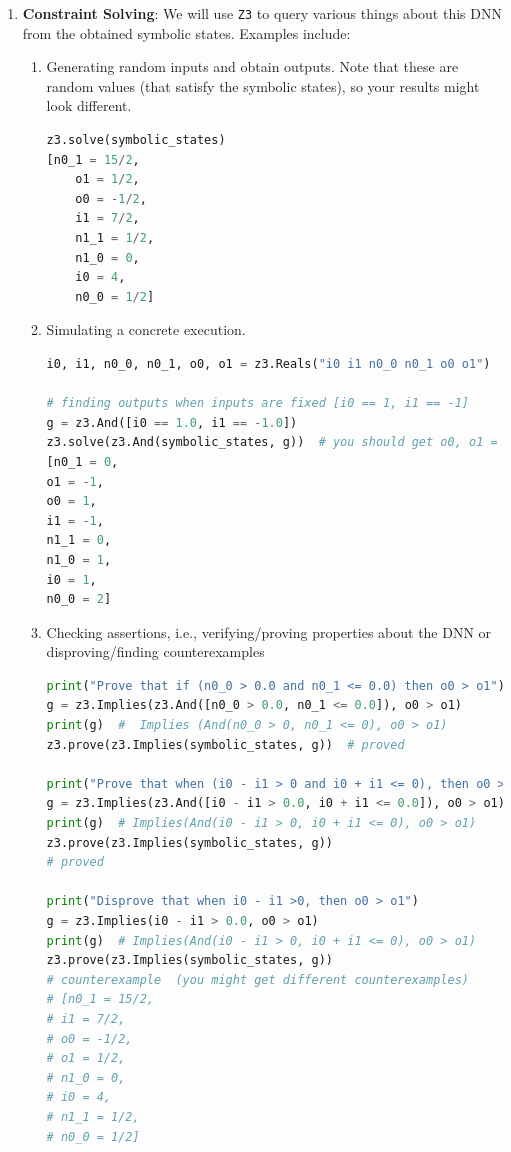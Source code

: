 \begin{enumerate}[label=\arabic*.]
\item \textbf{Constraint Solving}: We will use \texttt{Z3} to query various things about this DNN from the obtained symbolic states. Examples include:

\begin{enumerate}[label=(\alph*)]
\item Generating random inputs and obtain outputs.  Note that these are random values (that satisfy the symbolic states), so your results might look different.

\begin{lstlisting}[language=Python]
z3.solve(symbolic_states)
[n0_1 = 15/2,
    o1 = 1/2,
    o0 = -1/2,
    i1 = 7/2,
    n1_1 = 1/2,
    n1_0 = 0,
    i0 = 4,
    n0_0 = 1/2]
\end{lstlisting}

\item Simulating a concrete execution. 

\begin{lstlisting}[language=Python]
i0, i1, n0_0, n0_1, o0, o1 = z3.Reals("i0 i1 n0_0 n0_1 o0 o1")

# finding outputs when inputs are fixed [i0 == 1, i1 == -1]
g = z3.And([i0 == 1.0, i1 == -1.0])
z3.solve(z3.And(symbolic_states, g))  # you should get o0, o1 = 1, -1
[n0_1 = 0,
o1 = -1,
o0 = 1,
i1 = -1,
n1_1 = 0,
n1_0 = 1,
i0 = 1,
n0_0 = 2]
\end{lstlisting}

\item Checking assertions, i.e., verifying/proving properties about the DNN or disproving/finding counterexamples

\begin{lstlisting}[language=Python]
print("Prove that if (n0_0 > 0.0 and n0_1 <= 0.0) then o0 > o1")
g = z3.Implies(z3.And([n0_0 > 0.0, n0_1 <= 0.0]), o0 > o1)
print(g)  #  Implies (And(n0_0 > 0, n0_1 <= 0), o0 > o1)
z3.prove(z3.Implies(symbolic_states, g))  # proved

print("Prove that when (i0 - i1 > 0 and i0 + i1 <= 0), then o0 > o1")
g = z3.Implies(z3.And([i0 - i1 > 0.0, i0 + i1 <= 0.0]), o0 > o1)
print(g)  # Implies(And(i0 - i1 > 0, i0 + i1 <= 0), o0 > o1)
z3.prove(z3.Implies(symbolic_states, g))
# proved

print("Disprove that when i0 - i1 >0, then o0 > o1")
g = z3.Implies(i0 - i1 > 0.0, o0 > o1)
print(g)  # Implies(And(i0 - i1 > 0, i0 + i1 <= 0), o0 > o1)
z3.prove(z3.Implies(symbolic_states, g))
# counterexample  (you might get different counterexamples)
# [n0_1 = 15/2,
# i1 = 7/2,
# o0 = -1/2,
# o1 = 1/2,
# n1_0 = 0,
# i0 = 4,
# n1_1 = 1/2,
# n0_0 = 1/2]
\end{lstlisting}
\end{enumerate}
\end{enumerate}

